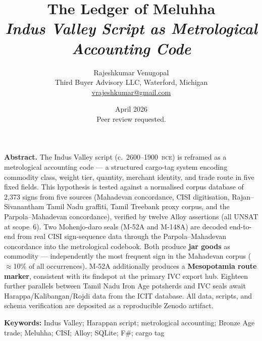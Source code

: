 \pagestyle{fancy}
\fancyhf{}
\renewcommand{\headrulewidth}{0.3pt}
\fancyhead[R]{\small\textit{\shorttitle}}
\fancyfoot[C]{\small\thepage}

\title{\textbf{The Ledger of Meluhha}\\
  \large\textit{Indus Valley Script as Metrological Accounting Code}}

\author{Rajeshkumar Venugopal \\
  \small Third Buyer Advisory LLC, Waterford, Michigan\\
  \small\href{mailto:vrajeshkumar@gmail.com}{vrajeshkumar@gmail.com}}

\date{April 2026\\[4pt]\small Peer review requested.}



\maketitle
\setlength{\skip\footins}{10pt}

\noindent\textbf{Abstract.}\enspace
The Indus Valley script (c.\ 2600--1900~\textsc{bce}) is reframed as
a metrological accounting code --- a structured cargo-tag system
encoding commodity class, weight tier, quantity, merchant identity,
and trade route in five fixed fields.
This hypothesis is tested against a normalised corpus database of
2{,}373 signs from five sources (Mahadevan concordance, CISI
digitisation, Rajan--Sivanantham Tamil Nadu graffiti, Tamil Treebank
proxy corpus, and the Parpola--Mahadevan concordance), verified by
twelve Alloy assertions (all UNSAT at scope~6).
Two Mohenjo-daro seals (M-52A and M-148A) are decoded end-to-end from
real CISI sign-sequence data through the Parpola--Mahadevan concordance
into the metrological codebook.
Both produce \textbf{jar goods} as commodity --- independently the most
frequent sign in the Mahadevan corpus ($\approx$10\% of all
occurrences).
M-52A additionally produces a \textbf{Mesopotamia route marker},
consistent with its findspot at the primary IVC export hub.
Eighteen further parallels between Tamil Nadu Iron Age potsherds and
IVC seals await Harappa/Kalibangan/Rojdi data from the ICIT database.
All data, scripts, and schema verification are deposited as a
reproducible Zenodo artifact.

\vspace{4pt}
\noindent\textbf{Keywords:} Indus Valley; Harappan script; metrological accounting;
Bronze Age trade; Meluhha; CISI; Alloy; SQLite; F\#; cargo tag

